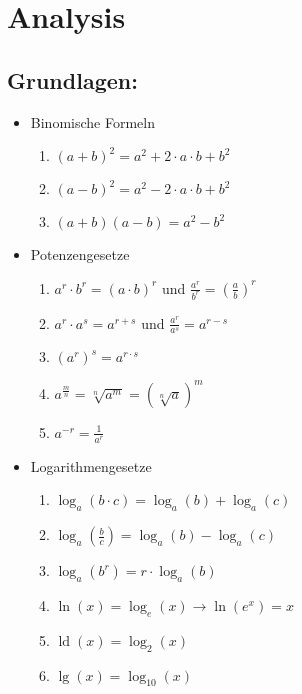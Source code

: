 \documentclass[a4paper,twocolumn,10pt]{onepgnote1}
\begin{document}
\pagestyle{empty}
\section{Analysis}
\subsection{Grundlagen:}
\begin{itemize}
\item Binomische Formeln\\
\begin{enumerate}
\item $(a+b)^2 = a^2+2\cdot a\cdot b + b^2$\\
\item $(a-b)^2 = a^2 -2\cdot a\cdot b + b^2$\\
\item $(a+b)(a-b) = a^2 - b^2$
\end{enumerate}
\item Potenzengesetze\\
\begin{enumerate}
\item $a^r \cdot b^r = (a\cdot b)^r$ und $\frac{a^r}{b^r} = \left(\frac{a}{b}\right)^r$\\
\item $a^r \cdot a^s = a^{r+s}$ und $ \frac{a^r}{a^s} = a^{r-s}$\\
\item $(a^r)^s = a^{r\cdot s}$\\
\item $a^{\frac{m}{n}} = \sqrt[n]{a^m} = (\sqrt[n]{a})^m$\\
\item $a^{-r} = \frac{1}{a^r}$
\end{enumerate}
\item Logarithmengesetze\\
\begin{enumerate}
\item $\log_a(b\cdot c) = \log_a(b) + \log_a(c)$\\
\item $\log_a(\frac{b}{c}) = \log_a(b) - \log_a(c)$\\
\item $\log_a(b^r) = r\cdot \log_a(b)$\\
\item $\ln(x) = \log_e(x) \longrightarrow \ln(e^x) =x $\\
\item $\operatorname{ld}(x) = \log_2(x)$\\
\item $\operatorname{lg}(x) = \log_{10}(x)$
\end{enumerate}
\end{itemize}
\end{document}
